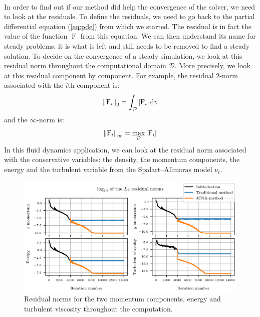         \paragraph{}
        In order to find out if our method did help the convergence of the solver, we need to look at the residuals.
        To define the residuals, we need to go back to the partial differential equation (\ref{eq:pde}) from which we started.
        The residual is in fact the value of the function $\operatorname{F}$ from this equation.
        We can then understand its name for steady problems: it is what is left and still needs to be removed to find a steady solution.
        To decide on the convergence of a steady simulation, we look at this residual norm throughout the computational domain $\mathcal{D}$.
        More precisely, we look at this residual component by component.
        For example, the residual 2-norm associated with the $i$th component is:
        \begin{equation}
          \norm[2]{\operatorname{F}_i} = \int_\mathcal{D} \left| \operatorname{F}_i \right| \mathrm{d}v
        \end{equation}
        and the $\infty$-norm is:
        \begin{equation}
          \norm[\infty]{\operatorname{F}_i} = \max_\mathcal{D} \left| \operatorname{F}_i \right|
        \end{equation}
        In this fluid dynamics application, we can look at the residual norm associated with the conservative variables: the density, the momentum components, the energy and the turbulent variable from the Spalart--Allmaras model $\nu_t$.

        \begin{figure}
          \centering
          \includegraphics{figures/rae_residuals.png}
          \caption{Residual norms for the two momentum components, energy and turbulent viscosity throughout the computation.}
          \label{fig:rae_residuals}
        \end{figure}

